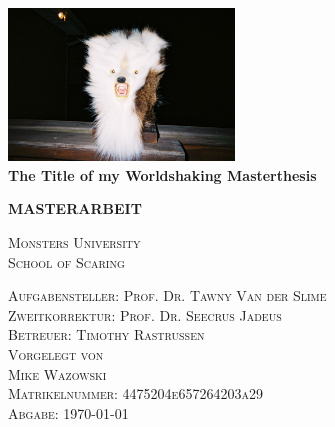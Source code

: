 \begin{titlepage}
\begin{singlespace}


\setlength{\hoffset}{-5mm} 
\setlength{\voffset}{-15mm}

\begin{center}

\includegraphics[width=6cm]{images/monster.jpg}\\

\vspace{1.5cm}
\LARGE
\textbf{The Title of my Worldshaking Masterthesis}\\

\vspace{1.5cm}

\large
\textbf{MASTERARBEIT}\\
\vspace{1.5cm}

\large
\textsc{
Monsters University\\
School of Scaring}\\

\vspace{1.5cm}

\textsc{Aufgabensteller: Prof. Dr. Tawny Van der Slime}\\
\smallskip
\textsc{Zweitkorrektur: Prof. Dr. Seecrus Jadeus}\\
\smallskip
\textsc{Betreuer: Timothy Rastrussen}\\


\vspace{1cm}
\textsc{Vorgelegt von\\
Mike Wazowski\\
Matrikelnummer: 4475204e657264203a29}\\

\vspace{1cm}
\textsc{Abgabe: \today}\\ %

\end{center}

\clearpage
\setlength{\hoffset}{0mm}
\end{singlespace}
\end{titlepage}
